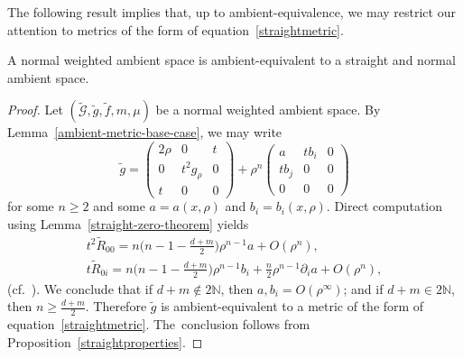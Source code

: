 The following result implies that, up to ambient-equivalence, we may restrict our attention to metrics of the form of equation~\eqref{straightmetric}.
\begin{Theorem}
\label{normal-to-straight-and-normal}
A normal weighted ambient space is ambient-equivalent to a straight and normal ambient space.
\end{Theorem}
\begin{proof}
Let $(\widetilde{\mathcal{G}},\widetilde{g},\widetilde{f},m,\mu)$ be a normal weighted ambient space. By Lemma~\ref{ambient-metric-base-case}, we may write
\[
\widetilde{g}=\begin{pmatrix} 2\rho&0&t\\0&t^2 g_\rho& 0\\ t&0&0\end{pmatrix}+\rho^n \begin{pmatrix} a& tb_i& 0\\ tb_j & 0 & 0\\ 0&0&0\end{pmatrix}
\]
for some $n\geq 2$ and some $a=a(x,\rho)$ and $b_i=b_i(x,\rho)$. Direct computation using Lemma~\ref{straight-zero-theorem} yields
\begin{gather*}
t^{2} \widetilde{R}_{00}=n\bigg(n-1-\frac{d+m}{2}\bigg) \rho^{n-1} a+O(\rho^{n}),
\\
t \widetilde{R}_{0 i}=n\bigg(n-1-\frac{d+m}{2}\bigg) \rho^{n-1} b_i+\frac{n}{2} \rho^{n-1} \partial_{i} a+O(\rho^{n}),
\end{gather*}
(cf.\ \cite[equation~(3.11)]{FeffermanGraham2012}).
We conclude that if $d+m\notin 2\mathbb{N}$, then $a,b_i=O(\rho^\infty)$; and if $d+m\in 2\mathbb{N}$, then $n\geq \frac{d+m}{2}$. Therefore $\widetilde{g}$ is ambient-equivalent to a metric of the form of equation~\eqref{straightmetric}. The~conclusion follows from Proposition~\ref{straightproperties}.
\end{proof}


